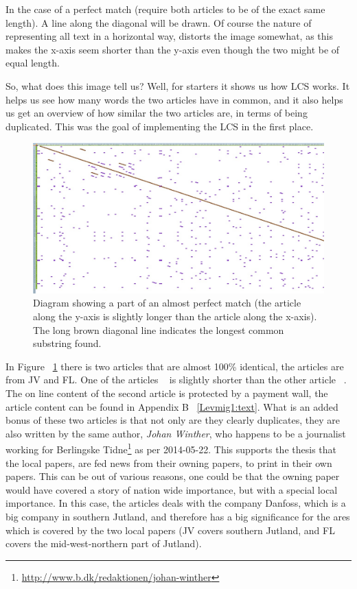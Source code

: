 In the case of a perfect match (require both articles to be of the exact same length). A line along the diagonal will be drawn. Of course the nature of representing all text in a horizontal way, distorts the image somewhat, as this makes the x-axis seem shorter than the y-axis even though the two might be of equal length. 

So, what does this image tell us? Well, for starters it shows us how LCS works. It helps us see how many words the two articles have in common, and it also helps us get an overview of how similar the two articles are, in terms of being duplicated. This was the goal of implementing the LCS in the first place.

\begin{figure}
	\centering
	\includegraphics[scale=0.35]{figures/PerfectMatch}
	\caption{Diagram showing a part of an almost perfect match (the article along the y-axis is slightly longer than the article along the x-axis). The long brown diagonal line indicates the longest common substring found.}
	\label{Match}
\end{figure}

In Figure ~\ref{Match} there is two articles that are almost 100\% identical, the articles are from JV and FL. One of the articles ~\cite{JV1} is slightly shorter than the other article ~\cite{Lemvig1}. The on line content of the second article is protected by a payment wall, the article content can be found in Appendix B ~\ref{Levmig1:text}.
What is an added bonus of these two articles is that not only are they clearly duplicates, they are also written by the same author, \textit{Johan Winther}, who happens to be a journalist working for Berlingske Tidne\footnote{\url{http://www.b.dk/redaktionen/johan-winther}} as per 2014-05-22. This supports the thesis that the local papers, are fed news from their owning papers, to print in their own papers. This can be out of various reasons, one could be that the owning paper would have covered a story of nation wide importance, but with a special local importance. In this case, the articles deals with the company Danfoss, which is a big company in southern Jutland, and therefore has a big significance for the ares which is covered by the two local papers (JV covers southern Jutland, and FL covers the mid-west-northern part of Jutland).


